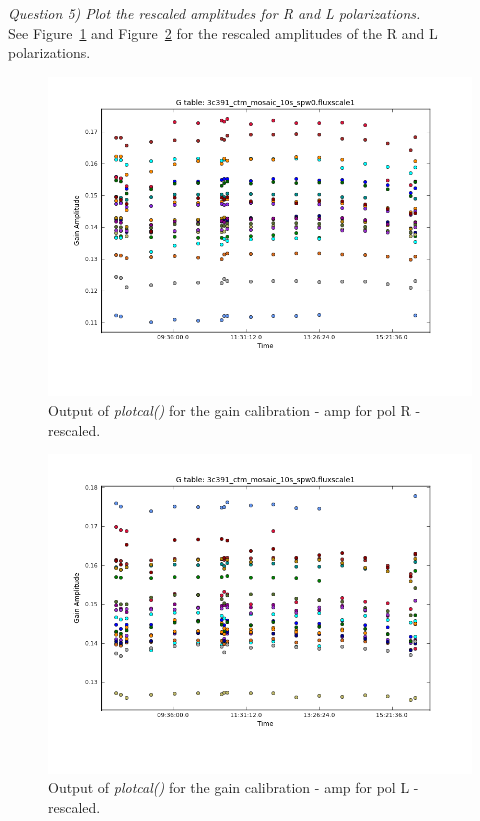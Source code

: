 \documentclass[12pt, a4paper]{article}
\begin{document}
\noindent \textit{Question 5) Plot the rescaled amplitudes for R and L polarizations.} \\
See Figure~\ref{fig:part4subG-amp-R} and Figure~\ref{fig:part4subG-amp-L} for the rescaled amplitudes of the R and L polarizations.
\newpage
\begin{figure}[h!]
    \centering
    \includegraphics[scale=0.5]{../Imaging/plots/part4-subG-question5_amp_pol-L.png}
    \caption{Output of \emph{plotcal()} for the gain calibration - amp for pol R - rescaled. \label{fig:part4subG-amp-R}}
\end{figure}
\begin{figure}[h!]
    \centering
    \includegraphics[scale=0.5]{../Imaging/plots/part4-subG-question5_amp_pol-R.png}
    \caption{Output of \emph{plotcal()} for the gain calibration - amp for pol L - rescaled. \label{fig:part4subG-amp-L}}
\end{figure}
\newpage
\end{document}
